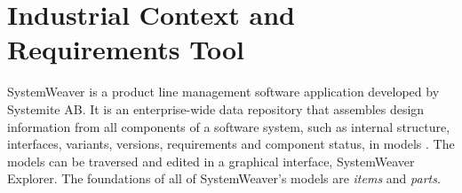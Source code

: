 \documentclass[conference]{IEEEtran}
\begin{document}



\section{Industrial Context and Requirements Tool}
\label{sec:i}
SystemWeaver is a product line management software application developed by Systemite AB. 
It is an enterprise-wide data repository that assembles design information from all components of a software system, such as internal structure, interfaces, variants, versions, requirements and component status, in models \cite{systemiteStruct}. The models can be traversed and edited in a graphical interface, SystemWeaver Explorer. The foundations of all of SystemWeaver's models are \emph{items} and \emph{parts}. 
\end{document}
